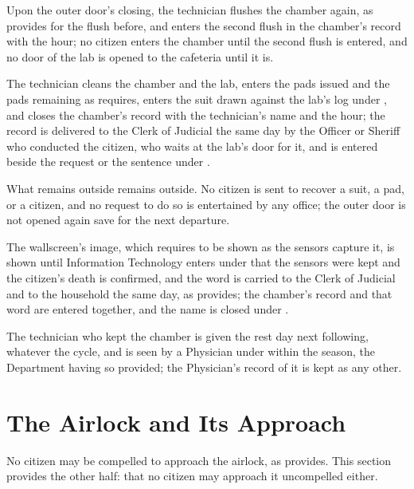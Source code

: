 \begin{clauses}
\item Upon the outer door's closing, the technician flushes the chamber again, as  provides for the flush before, and enters the second flush in the chamber's record with the hour; no citizen enters the chamber until the second flush is entered, and no door of the lab is opened to the cafeteria until it is.
\item The technician cleans the chamber and the lab, enters the pads issued and the pads remaining as  requires, enters the suit drawn against the lab's log under , and closes the chamber's record with the technician's name and the hour; the record is delivered to the Clerk of Judicial the same day by the Officer or Sheriff who conducted the citizen, who waits at the lab's door for it, and is entered beside the request or the sentence under .
\item What remains outside remains outside. No citizen is sent to recover a suit, a pad, or a citizen, and no request to do so is entertained by any office; the outer door is not opened again save for the next departure.
\item The wallscreen's image, which  requires to be shown as the sensors capture it, is shown until Information Technology enters under  that the sensors were kept and the citizen's death is confirmed, and the word is carried to the Clerk of Judicial and to the household the same day, as  provides; the chamber's record and that word are entered together, and the name is closed under .
\item The technician who kept the chamber is given the rest day next following, whatever the cycle, and is seen by a Physician under  within the season, the Department having so provided; the Physician's record of it is kept as any other.
\end{clauses}

\section{The Airlock and Its Approach}
\label{sec:cleaning:airlock-and-its-approach}

No citizen may be compelled to approach the airlock, as  provides. This section provides the other half: that no citizen may approach it uncompelled either.

